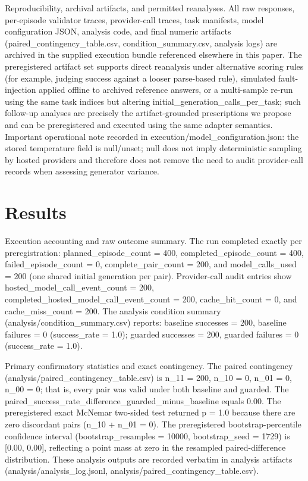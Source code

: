 \documentclass[conference]{IEEEtran}
\begin{document}
Reproducibility, archival artifacts, and permitted reanalyses. All raw responses, per-episode validator traces, provider-call traces, task manifests, model configuration JSON, analysis code, and final numeric artifacts (paired\_contingency\_table.csv, condition\_summary.csv, analysis logs) are archived in the supplied execution bundle referenced elsewhere in this paper. The preregistered artifact set supports direct reanalysis under alternative scoring rules (for example, judging success against a looser parse-based rule), simulated fault-injection applied offline to archived reference answers, or a multi-sample re-run using the same task indices but altering initial\_generation\_calls\_per\_task; such follow-up analyses are precisely the artifact-grounded prescriptions we propose and can be preregistered and executed using the same adapter semantics. Important operational note recorded in execution/model\_configuration.json: the stored temperature field is null/unset; null does not imply deterministic sampling by hosted providers and therefore does not remove the need to audit provider-call records when assessing generator variance.

\section{Results}
Execution accounting and raw outcome summary. The run completed exactly per preregistration: planned\_episode\_count = 400, completed\_episode\_count = 400, failed\_episode\_count = 0, complete\_pair\_count = 200, and model\_calls\_used = 200 (one shared initial generation per pair). Provider-call audit entries show hosted\_model\_call\_event\_count = 200, completed\_hosted\_model\_call\_event\_count = 200, cache\_hit\_count = 0, and cache\_miss\_count = 200. The analysis condition summary (analysis/condition\_summary.csv) reports: baseline successes = 200, baseline failures = 0 (success\_rate = 1.0); guarded successes = 200, guarded failures = 0 (success\_rate = 1.0).

Primary confirmatory statistics and exact contingency. The paired contingency (analysis/paired\_contingency\_table.csv) is n\_11 = 200, n\_10 = 0, n\_01 = 0, n\_00 = 0; that is, every pair was valid under both baseline and guarded. The paired\_success\_rate\_difference\_guarded\_minus\_baseline equals 0.00. The preregistered exact McNemar two-sided test returned p = 1.0 because there are zero discordant pairs (n\_10 + n\_01 = 0). The preregistered bootstrap-percentile confidence interval (bootstrap\_resamples = 10000, bootstrap\_seed = 1729) is [0.00, 0.00], reflecting a point mass at zero in the resampled paired-difference distribution. These analysis outputs are recorded verbatim in analysis artifacts (analysis/analysis\_log.jsonl, analysis/paired\_contingency\_table.csv).
\end{document}
